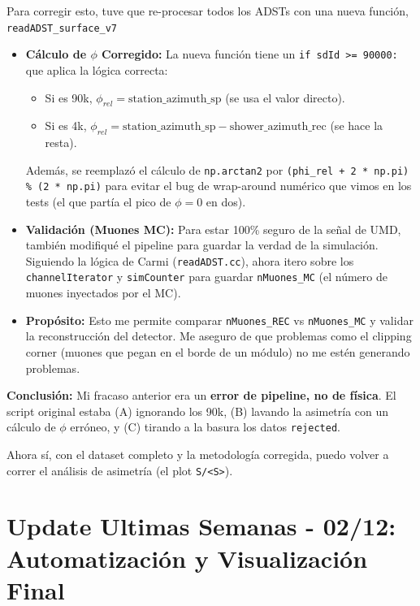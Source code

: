 Para corregir esto, tuve que re-procesar todos los ADSTs con una nueva función, \lstinline|readADST_surface_v7|

\begin{itemize}
	\item \textbf{Cálculo de $\phi$ Corregido:} La nueva función tiene un \lstinline|if sdId >= 90000:| que aplica la lógica correcta:
	\begin{itemize}
		\item Si es 90k, $\phi_{rel} = \text{station\_azimuth\_sp}$ (se usa el valor directo).
		\item Si es 4k, $\phi_{rel} = \text{station\_azimuth\_sp} - \text{shower\_azimuth\_rec}$ (se hace la resta).
	\end{itemize}
	Además, se reemplazó el cálculo de \lstinline|np.arctan2| por \lstinline|(phi_rel + 2 * np.pi) % (2 * np.pi)| para evitar el bug de wrap-around numérico que vimos en los tests (el que partía el pico de $\phi=0$ en dos).
	
	\item \textbf{Validación (Muones MC):} Para estar 100\% seguro de la señal de UMD, también modifiqué el pipeline para guardar la verdad de la simulación. Siguiendo la lógica de Carmi (\lstinline|readADST.cc|), ahora itero sobre los \lstinline|channelIterator| y \lstinline|simCounter| para guardar \lstinline|nMuones_MC| (el número de muones inyectados por el MC).
	
	\item \textbf{Propósito:} Esto me permite comparar \lstinline|nMuones_REC| vs \lstinline|nMuones_MC| y validar la reconstrucción del detector. Me aseguro de que problemas como el clipping corner (muones que pegan en el borde de un módulo) no me estén generando problemas.
\end{itemize}

\textbf{Conclusión:} Mi fracaso anterior era un \textbf{error de pipeline, no de física}. El script original estaba (A) ignorando los 90k, (B) lavando la asimetría con un cálculo de $\phi$ erróneo, y (C) tirando a la basura los datos \lstinline|rejected|.

Ahora sí, con el dataset completo y la metodología corregida, puedo volver a correr el análisis de asimetría (el plot \lstinline|S/<S>|).

\section*{Update Ultimas Semanas - 02/12: Automatización y Visualización Final}

